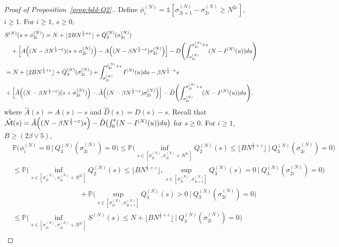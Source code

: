 \documentclass[11pt, reqno]{article}
\DeclarePairedDelimiter\autobracket{(}{)}
\newcommand{\br}[1]{\autobracket*{#1}}
\numberwithin{equation}{section}
\numberwithin{theorem}{section}
\begin{document}
\begin{proof}[Proof of Proposition~\ref{prop:bdd-Q2}.]
Define $\phi^{(N)}_i=\mathds{1}[\sigma^{(N)}_{2i+1}-\sigma^{(N)}_{2i}\geq  N^{2\varepsilon}]$, $i \ge 1$. For $i \ge 1$, $s \ge 0$,
\begin{equation}\label{eq:prop-4.14-1}
    \begin{split}
    &S^{(N)}(s+\sigma^{(N)}_{2i})=N+ \lfloor2BN^{\frac{1}{2} + \varepsilon}\rfloor+\bar{Q}^{(N)}_3(\sigma^{(N)}_{2i})\\
    &\quad+ \left[A\br{(N-\beta N^{\frac{1}{2}-\varepsilon})(s+ \sigma^{(N)}_{2i})} - A\br{(N-\beta N^{\frac{1}{2}-\varepsilon})\sigma^{(N)}_{2i}}\right] - D\br{\int_{\sigma^{(N)}_{2i}}^{\sigma^{(N)}_{2i}+s}(N-I^{(N)}(u))du}\\
    &=N+ \lfloor2BN^{\frac{1}{2} + \varepsilon}\rfloor +\bar{Q}^{(N)}_3(\sigma^{(N)}_{2i}) + \int_{\sigma^{(N)}_{2i}}^{\sigma^{(N)}_{2i}+s}I^{(N)}(u)du -\beta N^{\frac{1}{2}-\varepsilon}s\\
    &+ \left[\hat A\br{(N-\beta N^{\frac{1}{2}-\varepsilon})(s+ \sigma^{(N)}_{2i})} - \hat A\br{(N-\beta N^{\frac{1}{2}-\varepsilon})\sigma^{(N)}_{2i}}\right] - \hat D\br{\int_{\sigma^{(N)}_{2i}}^{\sigma^{(N)}_{2i}+s}(N-I^{(N)}(u))du}.
    \end{split}
\end{equation}
where $\hat{A}(s)=A(s)-s$ and $\hat{D}(s)=D(s)-s$. Recall that 
$\hat{\mathcal{M}}(s) = \hat{A}\br{(N-\beta N^{\frac{1}{2}-\varepsilon})s}-\hat{D}\br{\int_0^s(N-I^{(N)}(u))du}$ for $s \ge 0.$
For $i \ge 1$, $B\geq(2\beta\vee 5)$,
\begin{align*}
    & \mathbb{P}\Big(\phi^{(N)}_i=0\ \Big|\ Q^{(N)}_3(\sigma^{(N)}_{2i})=0\Big)\le \mathbb{P}\Big(\inf_{s\in[\sigma^{(N)}_{2i},\sigma^{(N)}_{2i}+N^{2\varepsilon}]}Q^{(N)}_2(s)\leq \lfloor BN^{\frac{1}{2}+\varepsilon} \rfloor\ \Big|\ Q^{(N)}_3(\sigma^{(N)}_{2i})=0\Big)\\
    &\leq \mathbb{P}\Big(\inf_{s\in[\sigma^{(N)}_{2i},\sigma^{(N)}_{2i}+N^{2\varepsilon}]}Q_2^{(N)}(s)\leq \lfloor BN^{\frac{1}{2}+\varepsilon}\rfloor, \sup_{s\in[\sigma^{(N)}_{2i},\sigma^{(N)}_{2i+1}]}Q^{(N)}_3(s)=0\ \Big|\ Q^{(N)}_3(\sigma^{(N)}_{2i})=0\Big)\\
    &\hspace{4cm}+\mathbb{P}\Big(\sup_{s\in[\sigma^{(N)}_{2i},\sigma^{(N)}_{2i+1}]}Q^{(N)}_3(s)>0\ \Big|\ Q^{(N)}_3(\sigma^{(N)}_{2i})=0\Big)\\
    &\leq \mathbb{P}\Big(\inf_{s\in[\sigma^{(N)}_{2i},\sigma^{(N)}_{2i}+N^{2\varepsilon}]}S^{(N)}(s)\leq N+ \lfloor BN^{\frac{1}{2}+\varepsilon}\rfloor\ \Big|\ Q^{(N)}_3(\sigma^{(N)}_{2i})=0\Big)\\

\end{align*}
\end{proof}
\end{document}
